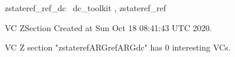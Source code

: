 \documentclass{article}
\begin{document}

\begin{zsection}	 \SECTION zstateref\_ref\_dc \parents~dc\_toolkit , zstateref\_ref
\end{zsection}

\newcommand{\appliesTo}{\zbinop{appliesTo}} 
\newcommand{\appliesToNofix}{\zpreop{appliesToNofix}} 

VC ZSection Created at Sun Oct 18 08:41:43 UTC 2020.



 VC Z section "zstaterefARGrefARGdc" has $0$ interesting VCs.



\end{document}

